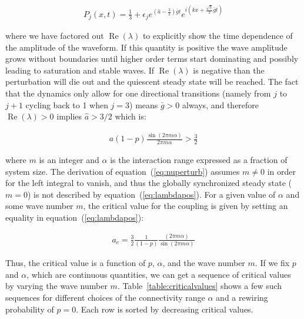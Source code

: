 \begin{align}
  P_j(x,t) = \frac{1}{3} + \epsilon_j e^{\left( \hat{a} - \frac{3}{2} \right)\bar{g}t} e^{i\left(kx + \frac{\sqrt{3}}{2}\bar{g}t\right)}
\end{align}

\noindent where we have factored out $\operatorname{Re}(\lambda)$ to explicitly show the time dependence of the amplitude of the
waveform. If this quantity is positive the wave amplitude grows without boundaries until higher order terms start dominating and
possibly leading to saturation and stable waves. If $\operatorname{Re}(\lambda)$ is negative than the perturbation will die out and the
quiescent steady state will be reached. The fact that the dynamics only allow for one directional transitions (namely from $j$ to $j+1$
cycling back to 1 when $j=3$) means $\bar{g}>0$ always, and therefore $\operatorname{Re}(\lambda)>0$ implies $\hat{a} > 3/2$ which is:

\begin{align}
  a(1-p)\frac{\sin(2\pi m\alpha)}{2\pi m\alpha} > \frac{3}{2}
  \label{eq:lambdapos}
\end{align}

\noindent where $m$ is an integer and $\alpha$ is the interaction range expressed as a fraction of system size. The derivation of
equation~(\ref{eq:nuperturb}) assumes $m\neq 0$ in order for the left integral to vanish, and thus the globally synchronized steady
state ($m=0$) is not described by equation~(\ref{eq:lambdapos}). For a given value of $\alpha$ and some wave number $m$, the critical
value for the coupling is given by setting an equality in equation~(\ref{eq:lambdapos}):

\begin{align}
  a_c = \frac{3}{2}\frac{1}{(1-p)}\frac{(2\pi m\alpha)}{\sin(2\pi m\alpha)}
	\label{eq:ac}
\end{align}

Thus, the critical value is a function of $p$, $\alpha$, and the wave number $m$. If we fix $p$ and $\alpha$, which are continuous
quantities, we can get a sequence of critical values by varying the wave number $m$. Table~\ref{table:criticalvalues} shows a few such
sequences for different choices of the connectivity range $\alpha$ and a rewiring probability of $p=0$. Each row is sorted by
decreasing critical values.

\newcommand{\cc}{\cellcolor}

